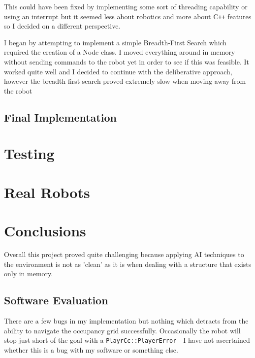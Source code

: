 \documentclass[a4paper,12pt]{article}
\begin{document}
This could have been fixed by implementing some sort of threading capability or using an interrupt but it seemed less about robotics and more about C\texttt{++} features so I decided on a different perspective.

I began by attempting to implement a simple Breadth-First Search which required the creation of a Node class. I moved everything around in memory without sending commands to the robot yet in order to see if this was feasible. It worked quite well and I decided to continue with the deliberative approach, however the breadth-first search proved extremely slow when moving away from the robot
\subsection{Final Implementation}
\section{Testing}
\section{Real Robots}
\section{Conclusions}
Overall this project proved quite challenging because applying AI techniques to the environment is not as 'clean' as it is when dealing with a structure that exists only in memory.

\subsection{Software Evaluation} %
There are a few bugs in my implementation but nothing which detracts from the ability to navigate the occupancy grid successfully. Occasionally the robot will stop just short of the goal with a \texttt{PlayrCc::PlayerError} - I have not ascertained whether this is a bug with my software or something else.
\end{document}
